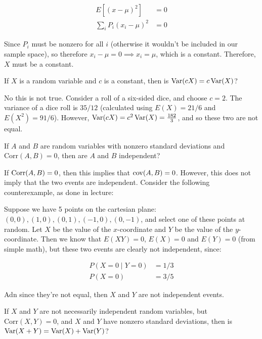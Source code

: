 \documentclass[11pt]{article}
\begin{document}
\begin{Parts}
\begin{solution}
        \begin{align*}
            E[(x - \mu)^2] &= 0\\
            \sum_i P_i (x_i - \mu)^2 &= 0
        \end{align*}

        Since $P_i$ must be nonzero for all $i$ (otherwise it wouldn't be included in our sample space), so therefore $x_i - \mu = 0 \implies x_i = \mu$, which is a constant. Therefore, $X$ must be a constant.
    \end{solution}
	

	\Part If $X$ is a random variable and $c$ is a constant, then is $\operatorname{Var} (cX) = c \operatorname{Var} (X)$?

    \begin{solution}
        No this is not true. Consider a roll of a six-sided dice, and choose $c = 2$. The variance of a dice roll is $35/12$ (calculated using $E(X) = 21/6$ and $E(X^2) = 91/6$). However, $\operatorname{Var}(cX) = c^2 \operatorname{Var}(X) = \frac{182}{3}$, and so these two are not equal.
    \end{solution}
	

	\Part If $A$ and $B$ are random variables with nonzero standard deviations and $\text{Corr} (A, B) = 0$, then are $A$ and $B$ independent?

    \begin{solution}
        If $\operatorname{Corr}(A, B) = 0$, then this implies that $\operatorname{cov}(A, B) = 0$. However, this does not imply that the two events are independent. Consider the following counterexample, as done in lecture: 

        Suppose we have 5 points on the cartesian plane: $(0, 0), (1, 0), (0, 1), (-1, 0), (0, -1)$, and select one of these points at random. Let $X$ be the value of the $x$-coordinate and $Y$ be the value of the $y$-coordinate. Then we know that $E(XY) = 0$, $E(X) = 0$ and $E(Y) = 0$ (from simple math), but these two events are clearly not independent, since: 

        \begin{align*}
            P(X = 0 \mid Y = 0) &= 1/3\\
            P(X = 0) &= 3/5
        \end{align*}

        Adn since they're not equal, then $X$ and $Y$ are not independent events.

    \end{solution}
	

	\Part If $X$ and $Y$ are not necessarily independent random variables, but $\text{Corr} (X, Y) = 0$, and $X$ and $Y$ have nonzero standard deviations, then is $\operatorname{Var} (X+Y) = \operatorname{Var}(X) + \operatorname{Var}(Y)$?


\end{Parts}
\end{document}
